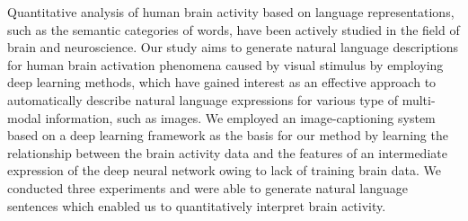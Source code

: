 Quantitative analysis of human brain activity based on language representations, such as the semantic categories of words, have been actively studied in the field of brain and neuroscience. Our study aims to generate natural language descriptions for human brain activation phenomena caused by visual stimulus by employing deep learning methods, which have gained interest as an effective approach to automatically describe natural language expressions for various type of multi-modal information, such as images. We employed an image-captioning system based on a deep learning framework as the basis for our method by learning the relationship between the brain activity data and the features of an intermediate expression of the deep neural network owing to lack of training brain data. We conducted three experiments and were able to generate natural language sentences which enabled us to quantitatively interpret brain activity.
